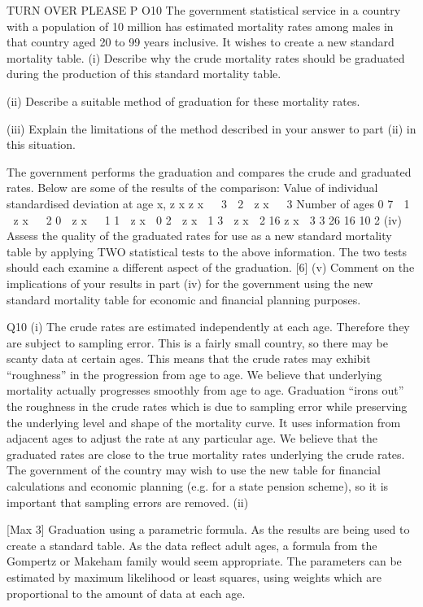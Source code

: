 \documentclass[a4paper,12pt]{article}
\begin{document}
TURN OVER
PLEASE
P
O10
The government statistical service in a country with a population of 10 million has
estimated mortality rates among males in that country aged 20 to 99 years inclusive.
It wishes to create a new standard mortality table.
(i)
Describe why the crude mortality rates should be graduated during the
production of this standard mortality table.

(ii) Describe a suitable method of graduation for these mortality rates.

(iii) Explain the limitations of the method described in your answer to part (ii) in
this situation.

The government performs the graduation and compares the crude and graduated rates.
Below are some of the results of the comparison:
Value of individual standardised
deviation at age x, z x
z x   3
 2  z x   3
Number of ages
0
7
 1  z x   2
0  z x   1
1  z x  0
2  z x  1
3  z x  2 16
z x  3 3
26
16
10
2
(iv) Assess the quality of the graduated rates for use as a new standard mortality
table by applying TWO statistical tests to the above information. The two
tests should each examine a different aspect of the graduation.
[6]
(v) Comment on the implications of your results in part (iv) for the government
using the new standard mortality table for economic and financial planning
purposes.



Q10
(i)
The crude rates are estimated independently at each age. 
Therefore they are subject to sampling error. 
This is a fairly small country, so there may be scanty data at certain ages. 
This means that the crude rates may exhibit “roughness” in the
progression from age to age. 
We believe that underlying mortality actually progresses smoothly
from age to age. 
Graduation “irons out” the roughness in the crude rates which is due to
sampling error while preserving the underlying level and shape of the
mortality curve. 
It uses information from adjacent ages to adjust the rate at any
particular age. 
We believe that the graduated rates are close to the true mortality
rates underlying the crude rates. 
The government of the country may wish to use the new table for
financial calculations and economic planning (e.g. for a state
pension scheme), so it is important that sampling errors are removed.
(ii)

[Max 3]
Graduation using a parametric formula. 
As the results are being used to create a standard table. 
As the data reflect adult ages, a formula from the Gompertz or
Makeham family would seem appropriate. 
The parameters can be estimated by maximum likelihood or least squares,
using weights which are proportional to the amount of data at each age.
\end{document}
